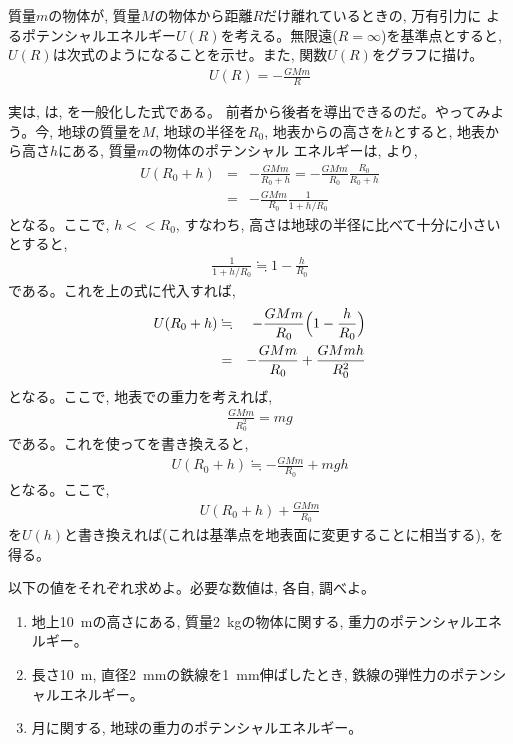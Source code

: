 \begin{q}\label{q:potential_gravity}
質量$m$の物体が, 質量$M$の物体から距離$R$だけ離れているときの, 万有引力に
よるポテンシャルエネルギー$U(R)$を考える。無限遠($R=\infty$)を基準点とすると, 
$U(R)$は次式のようになることを示せ。また, 関数$U(R)$をグラフに描け。
\begin{eqnarray}
U(R)=-\frac{GMm}{R}\label{eq:potential_gravity}
\end{eqnarray}
\end{q}
\mv

実は, は, を一般化した式である。
前者から後者を導出できるのだ。やってみよう。今, 地球の質量を$M$, 地球の半径を$R_0$, 
地表からの高さを$h$とすると, 地表から高さ$h$にある, 質量$m$の物体のポテンシャル
エネルギーは, より, 
\begin{eqnarray}
U(R_0+h)&=&-\frac{GMm}{R_0+h}
=-\frac{GMm}{R_0}\frac{R_0}{R_0+h}\nonumber\\
&=&-\frac{GMm}{R_0}\frac{1}{1+h/R_0}
\end{eqnarray}
となる。ここで, $h<<R_0$, すなわち, 高さは地球の半径に比べて十分に小さいとすると, 
\begin{eqnarray}
\frac{1}{1+h/R_0}\fallingdotseq 1-\frac{h}{R_0}
\end{eqnarray}
である。これを上の式に代入すれば, 
\begin{eqnarray}
U(R_0+h)&\fallingdotseq&-\frac{GMm}{R_0}\Bigl(1-\frac{h}{R_0}\Bigr)\nonumber\\
&=&-\frac{GMm}{R_0}+\frac{GMmh}{R_0^2}\label{eq:pot_grav_approx_08}
\end{eqnarray}
となる。ここで, 地表での重力を考えれば, 
\begin{eqnarray}
\frac{GMm}{R_0^2}=mg
\end{eqnarray}
である。これを使ってを書き換えると, 
\begin{eqnarray}
U(R_0+h)\fallingdotseq-\frac{GMm}{R_0}+mgh\label{eq:pot_grav_approx_09}
\end{eqnarray}
となる。ここで, 
\begin{eqnarray}
U(R_0+h)+\frac{GMm}{R_0}
\end{eqnarray}
を$U(h)$と書き換えれば(これは基準点を地表面に変更することに相当する), を得る。\\

\begin{q}\label{q:potential_etc}
以下の値をそれぞれ求めよ。必要な数値は, 各自, 調べよ。
\begin{enumerate}
\item 地上10~mの高さにある, 質量2~kgの物体に関する, 重力のポテンシャルエネルギー。
\item 長さ10~m, 直径2~mmの鉄線を1~mm伸ばしたとき, 鉄線の弾性力のポテンシャルエネルギー。
\item 月に関する, 地球の重力のポテンシャルエネルギー。
\end{enumerate}
\end{q}
\mv

